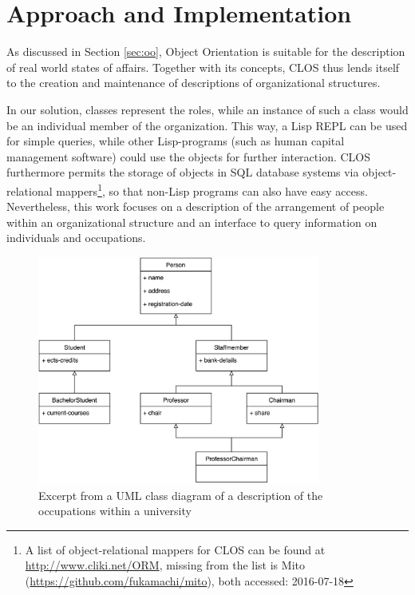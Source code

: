 \documentclass[oribibl]{llncs}
\begin{document}
\section{Approach and Implementation}
\label{sec:approach}

As discussed in Section \ref{sec:oo}, Object Orientation is suitable for the description of real world states of affairs. Together with its concepts, CLOS thus lends itself to the creation and maintenance of descriptions of organizational structures.

In our solution, classes represent the roles, while an instance of such a class would be an individual member of the organization. This way, a Lisp REPL can be used for simple queries, while other Lisp-programs (such as human capital management software) could use the objects for further interaction. CLOS furthermore permits the storage of objects in SQL database systems via object-relational mappers\footnote{A list of object-relational mappers for CLOS can be found at \url{http://www.cliki.net/ORM}, missing from the list is Mito (\url{https://github.com/fukamachi/mito}), both accessed: 2016-07-18}, so that non-Lisp programs can also have easy access. Nevertheless, this work focuses on a description of the arrangement of people within an organizational structure and  an interface to query information on individuals and occupations.
\newline

\begin{figure}[]
    \centering
    \includegraphics[width=0.83\textwidth]{images/class-diagram.png}
    \caption{Excerpt from a UML class diagram of a description of the occupations within a university}
    \label{fig:class-diagram}
\end{figure}
\end{document}
